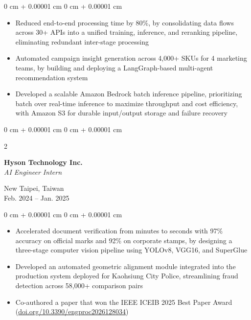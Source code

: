 \documentclass[11pt, letterpaper]{article}
\newcommand{\entrysep}{0.26cm}
\newcommand{\titlesep}{0.12cm}
\newenvironment{highlights}{
    \begin{itemize}[
        topsep=0pt,
        parsep=0pt,
        partopsep=0pt,
        itemsep=0.10cm,
        leftmargin=*,
        labelindent=10pt
    ]
}{
    \end{itemize}
} %
\newenvironment{onecolentry}{
    \begin{adjustwidth}{
        0 cm + 0.00001 cm
    }{
        0 cm + 0.00001 cm
    }
}{
    \end{adjustwidth}
} %
\newenvironment{twocolentry}[2][]{
    \onecolentry
    \def\secondColumn{#2}
    \setcolumnwidth{\fill, 4.5 cm}
    \begin{paracol}{2}
}{
    \switchcolumn \raggedleft \secondColumn
    \end{paracol}
    \endonecolentry
} %
\begin{document}
    \vspace{\titlesep}
    \begin{onecolentry}
        \begin{highlights}
            \item Reduced end-to-end processing time by 80\%, by consolidating data flows across 30+ APIs into a unified training, inference, and reranking pipeline, eliminating redundant inter-stage processing
            \item Automated campaign insight generation across 4,000+ SKUs for 4 marketing teams, by building and deploying a LangGraph-based multi-agent recommendation system
            \item Developed a scalable Amazon Bedrock batch inference pipeline, prioritizing batch over real-time inference to maximize throughput and cost efficiency, with Amazon S3 for durable input/output storage and failure recovery
        \end{highlights}
    \end{onecolentry}

    \vspace{\entrysep}
    \begin{twocolentry}{
        New Taipei, Taiwan\\
        Feb. 2024 – Jan. 2025
    }
        \textbf{Hyson Technology Inc.}\\
        \textit{AI Engineer Intern}
    \end{twocolentry}

    \vspace{\titlesep}
    \begin{onecolentry}
        \begin{highlights}
            \item Accelerated document verification from minutes to seconds with 97\% accuracy on official marks and 92\% on corporate stamps, by designing a three-stage computer vision pipeline using YOLOv8, VGG16, and SuperGlue
            \item Developed an automated geometric alignment module integrated into the production system deployed for Kaohsiung City Police, streamlining fraud detection across 58,000+ comparison pairs
            \item Co-authored a paper that won the IEEE ICEIB 2025 Best Paper Award (\href{https://doi.org/10.3390/engproc2026128034}{doi.org/10.3390/engproc2026128034})
        \end{highlights}
    \end{onecolentry}
\end{document}
